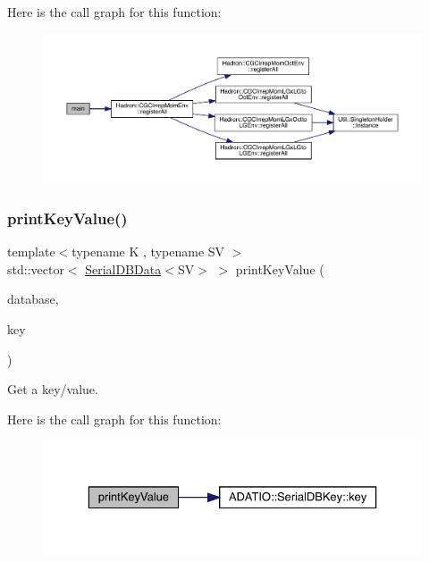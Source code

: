 Here is the call graph for this function\+:
\nopagebreak
\begin{figure}[H]
\begin{center}
\leavevmode
\includegraphics[width=350pt]{d4/dbc/adat-devel_2main_2dbutil_2dbbin_8cc_a3c04138a5bfe5d72780bb7e82a18e627_cgraph}
\end{center}
\end{figure}
\mbox{\label{adat-devel_2main_2dbutil_2dbbin_8cc_ad99136392a8c4064c84803fee6e0c857}} 
\subsubsection{\texorpdfstring{printKeyValue()}{printKeyValue()}}
{\footnotesize\ttfamily template$<$typename K , typename SV $>$ \\
std\+::vector$<$ \mbox{\hyperlink{classADATIO_1_1SerialDBData}{Serial\+D\+B\+Data}}$<$SV$>$ $>$ print\+Key\+Value (\begin{DoxyParamCaption}\item[{\mbox{\hyperlink{classFILEDB_1_1AllConfStoreDB}{All\+Conf\+Store\+DB}}$<$ \mbox{\hyperlink{classADATIO_1_1SerialDBKey}{Serial\+D\+B\+Key}}$<$ K $>$, \mbox{\hyperlink{classADATIO_1_1SerialDBData}{Serial\+D\+B\+Data}}$<$ SV $>$ $>$ \&}]{database,  }\item[{\mbox{\hyperlink{classADATIO_1_1SerialDBKey}{Serial\+D\+B\+Key}}$<$ K $>$ \&}]{key }\end{DoxyParamCaption})}



Get a key/value. 

Here is the call graph for this function\+:
\nopagebreak
\begin{figure}[H]
\begin{center}
\leavevmode
\includegraphics[width=329pt]{d4/dbc/adat-devel_2main_2dbutil_2dbbin_8cc_ad99136392a8c4064c84803fee6e0c857_cgraph}
\end{center}
\end{figure}
